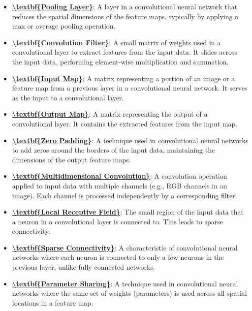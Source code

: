 \documentclass{article}%
\begin{document}
\begin{itemize}[leftmargin=*]
\item \href{https://www.math.purdue.edu/~yipn/351/09L1-cnn.pdf#page=6}{\textbf{\textbackslash{}textbf\{Pooling Layer\}}}: A layer in a convolutional neural network that reduces the spatial dimensions of the feature maps, typically by applying a max or average pooling operation.%
\item \href{https://www.math.purdue.edu/~yipn/351/09L1-cnn.pdf#page=7}{\textbf{\textbackslash{}textbf\{Convolution Filter\}}}: A small matrix of weights used in a convolutional layer to extract features from the input data. It slides across the input data, performing element-wise multiplication and summation.%
\item \href{https://www.math.purdue.edu/~yipn/351/09L1-cnn.pdf#page=7}{\textbf{\textbackslash{}textbf\{Input Map\}}}: A matrix representing a portion of an image or a feature map from a previous layer in a convolutional neural network. It serves as the input to a convolutional layer.%
\item \href{https://www.math.purdue.edu/~yipn/351/09L1-cnn.pdf#page=7}{\textbf{\textbackslash{}textbf\{Output Map\}}}: A matrix representing the output of a convolutional layer. It contains the extracted features from the input map.%
\item \href{https://www.math.purdue.edu/~yipn/351/09L1-cnn.pdf#page=7}{\textbf{\textbackslash{}textbf\{Zero Padding\}}}: A technique used in convolutional neural networks to add zeros around the borders of the input data, maintaining the dimensions of the output feature maps.%
\item \href{https://www.math.purdue.edu/~yipn/351/09L1-cnn.pdf#page=8}{\textbf{\textbackslash{}textbf\{Multidimensional Convolution\}}}: A convolution operation applied to input data with multiple channels (e.g., RGB channels in an image). Each channel is processed independently by a corresponding filter.%
\item \href{https://www.math.purdue.edu/~yipn/351/09L1-cnn.pdf#page=10}{\textbf{\textbackslash{}textbf\{Local Receptive Field\}}}: The small region of the input data that a neuron in a convolutional layer is connected to. This leads to sparse connectivity.%
\item \href{https://www.math.purdue.edu/~yipn/351/09L1-cnn.pdf#page=10}{\textbf{\textbackslash{}textbf\{Sparse Connectivity\}}}: A characteristic of convolutional neural networks where each neuron is connected to only a few neurons in the previous layer, unlike fully connected networks.%
\item \href{https://www.math.purdue.edu/~yipn/351/09L1-cnn.pdf#page=12}{\textbf{\textbackslash{}textbf\{Parameter Sharing\}}}: A technique used in convolutional neural networks where the same set of weights (parameters) is used across all spatial locations in a feature map.%

\end{itemize}
\end{document}
